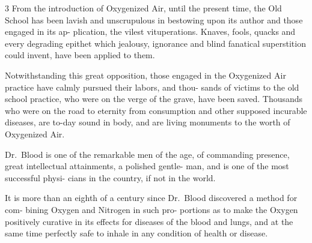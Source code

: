 \documentclass[10pt]{article}
\begin{document}
\begin{multicols}{3}
	From the introduction of Oxygenized Air,\linebreak
	until the present time, the Old School has\linebreak
	been lavish and unscrupulous in bestowing\linebreak
	upon its author and those engaged in its ap-\linebreak
	plication, the vilest vituperations. Knaves,\linebreak
	fools, quacks and every degrading epithet\linebreak
	which jealousy, ignorance and blind fanatical\linebreak
	superstition could invent, have been applied\linebreak
	to them.

	Notwithstanding this great opposition,\linebreak
	those engaged in the Oxygenized Air practice\linebreak
	have calmly pursued their labors, and thou-\linebreak
	sands of victims to the old school practice,\linebreak
	who were on the verge of the grave, have been\linebreak
	saved. Thousands who were on the road to\linebreak
	eternity from consumption and other supposed\linebreak
	incurable diseases, are to-day sound in body,\linebreak
	and are living monuments to the worth of\linebreak
	Oxygenized Air.

	Dr.~Blood is one of the remarkable men\linebreak
	of the age, of commanding presence, great\linebreak
	intellectual attainments, a polished gentle-\linebreak
	man, and is one of the most successful physi-\linebreak
	cians in the country, if not in the world.

	It is more than an eighth of a century\linebreak
	since Dr.~Blood discovered a method for com-\linebreak
	bining Oxygen and Nitrogen in such pro-\linebreak
	portions as to make the Oxygen positively curative in its effects for diseases\linebreak
	of the blood and lungs, and at the same time perfectly safe to inhale in any\linebreak
	condition of health or disease.


\end{multicols}
\end{document}
